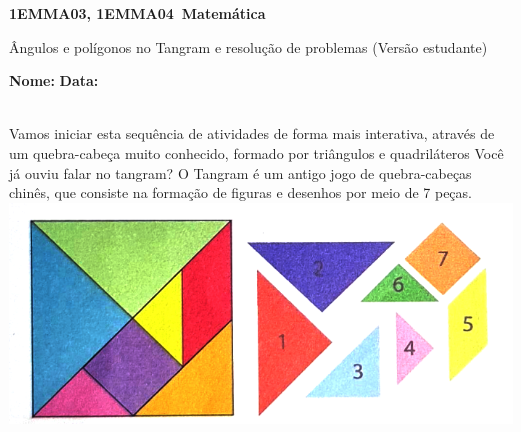 \documentclass[a4paper, 14pt]{article}
\begin{document}
	
	\noindent\textbf{1EMMA03, 1EMMA04~Matemática} 
	
	\begin{center}Ângulos e polígonos no Tangram e resolução de problemas (Versão estudante)
	\end{center}
	
	\noindent\textbf{Nome:} \underline{\hspace{10cm}}
	\noindent\textbf{Data:} \underline{\hspace{4cm}}
	
	~ \\
	\indent Vamos iniciar esta sequência de atividades de forma mais interativa, através de um quebra-cabeça muito conhecido, formado por triângulos e quadriláteros 
	Você já ouviu falar no tangram? 
	O Tangram é um antigo jogo de quebra-cabeças chinês, que consiste na formação de figuras e desenhos por meio de 7 peças. 
\\
	\includegraphics[width=1\linewidth]{1EMMA03_imagens/imagem01}
	
\end{document}
